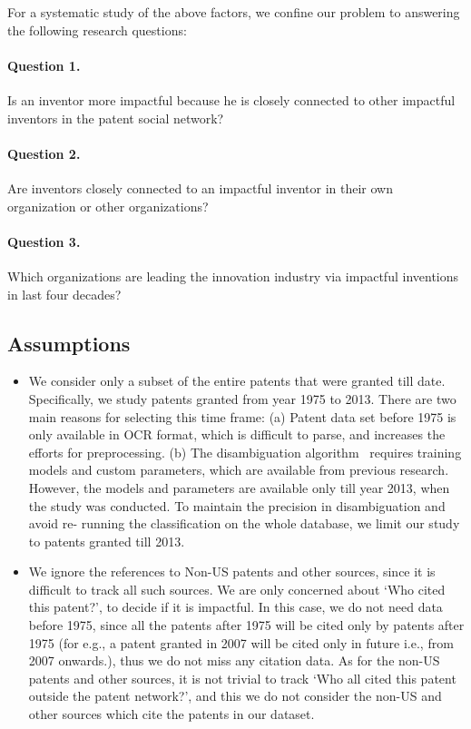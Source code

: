 For a systematic study of the above factors, we confine our problem to
answering the following research questions:

\paragraph{Question 1.} Is an inventor more impactful because he is closely
connected to other impactful inventors in the patent social network? 

\paragraph{Question  2.} Are inventors closely connected to an impactful
inventor in their own organization or other organizations? %

\paragraph{Question  3.} Which organizations are leading the innovation industry via impactful inventions in last four decades? %


\subsection{Assumptions}
\label{sec:assumptions}
	\begin{itemize}
	\squish
		\item We consider only a subset of the entire patents that were granted till
		date. Specifically, we study patents granted from year 1975 to 2013. There are
		two main reasons for selecting this time frame: (a) Patent data set before
		1975 is only available in OCR format, which is difficult to parse, and
		increases the efforts for preprocessing. (b) The disambiguation
		algorithm~\cite{disambiguation}  requires training models and custom
		parameters, which are available from previous research. However, the models
		and parameters are available only till year 2013, when the study was
		conducted. To maintain the precision in disambiguation and avoid re- running
		the classification on the whole database, we limit our study to patents
		granted till 2013.
		\item We ignore the references to Non-US patents and other sources, since it
		is difficult to track all such sources.  We are only concerned about `Who
		cited this patent?', to decide if it is impactful. In this case, we do not
		need data before 1975, since all the patents after 1975 will be cited only by
		patents after 1975 (for e.g., a patent granted in 2007 will be cited only in
		future i.e., from 2007 onwards.), thus we do not miss any citation data. As
		for the non-US patents and other sources, it is not trivial to track `Who all
		cited this patent outside the patent network?', and this we do not consider
		the non-US and other sources which cite the patents in our dataset.
	\end{itemize}

